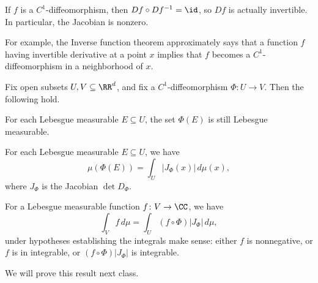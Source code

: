 \documentclass[../notes.tex]{subfiles}
\begin{document}
\begin{remark}
	If $f$ is a $C^1$-diffeomorphism, then $Df\circ Df^{-1}=\id$, so $Df$ is actually invertible. In particular, the Jacobian is nonzero.
\end{remark}
\begin{remark}
	For example, the Inverse function theorem approximately says that a function $f$ having invertible derivative at a point $x$ implies that $f$ becomes a $C^1$-diffeomorphism in a neighborhood of $x$.
\end{remark}
\begin{theorem} \label{thm:change-vars}
	Fix open subsets $U,V\subseteq\RR^d$, and fix a $C^1$-diffeomorphism $\Phi\colon U\to V$. Then the following hold.
	\begin{listalph}
		\item For each Lebesgue measurable $E\subseteq U$, the set $\Phi(E)$ is still Lebesgue measurable.
		\item For each Lebesgue measurable $E\subseteq U$, we have
		\[\mu(\Phi(E))=\int_U\left|J_\Phi(x)\right|\,d\mu(x),\]
		where $J_\Phi$ is the Jacobian $\det D_\Phi$.
		\item For a Lebesgue measurable function $f\colon V\to\CC$, we have
		\[\int_Vf\,d\mu=\int_U(f\circ\Phi)\left|J_\Phi\right|\,d\mu,\]
		under hypotheses establishing the integrals make sense: either $f$ is nonnegative, or $f$ is in integrable, or $(f\circ\Phi)\left|J_\Phi\right|$ is integrable.
	\end{listalph}
\end{theorem}
We will prove this result next class.
\end{document}
